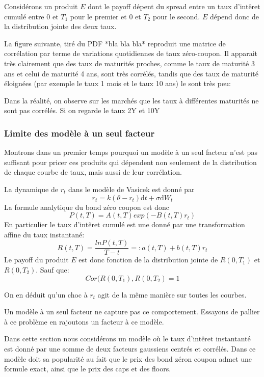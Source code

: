 Considérons un produit $E$ dont le payoff  dépent  du spread entre un taux d'intêret cumulé entre $0$ et $T_1$ pour le premier et $0$ et $T_2$ pour le second. $E$ dépend donc de la distribution jointe des deux taux.

La figure suivante, tiré du PDF *bla bla bla* reproduit une matrice de corrélation par terme de variations quotidiennes de taux zéro-coupon. Il apparait très clairement que des taux de maturités proches, comme le taux de maturité 3 ans et celui de maturité 4 ans, sont très corrélés, tandis que des taux de maturité éloignées (par exemple le taux 1 mois et le taux 10 ans) le sont très peu:


Dans la réalité, on observe sur les marchés que les taux à différentes maturités ne sont pas corrélés. Si on regarde le taux 2Y et 10Y


\subsubsection{Limite des modèle à un seul facteur}
Montrons dans un premier temps pourquoi un modèle à un seul facteur n'est pas suffisant pour pricer ces produits qui dépendent non seulement de la distribution de chaque courbe de taux, mais aussi de leur corrélation. 

La dynamique de $r_t$ dans le modèle de Vasicek est donné par
$$r_t = k(\theta - r_t)  \mathrm{d}t  + \sigma \mathrm{d}W_t$$
La formule analytique du bond zéro coupon est donc
$$P(t, T) = A(t, T) exp(-B(t, T) r_t)$$
En particulier le taux d'intêret cumulé est une donné par une transformation affine du taux instantané:
$$R(t, T) = \frac{ln P(t, T)}{T-t} =: a(t, T) + b(t, T) r_t$$
Le payoff du produit $E$ est donc fonction de la distribution jointe de $R(0, T_1)$ et $R(0, T_2)$. Sauf que:
$$Cor(R(0, T_1), R(0, T_2) = 1$$

On en déduit qu'un choc à $r_t$ agit de la même manière sur toutes les courbes.


Un modèle à un seul facteur ne capture pas ce comportement. Essayons de pallier à ce problème en rajoutons un facteur à ce modèle.

Dans cette section nous considérons un modèle où le taux d'intêret instantanté est donné par une somme de deux facteurs gaussiens centrés et corrélés. Dans ce modèle doit sa popularité au fait que le prix des bond zéron coupon admet une formule exact, ainsi que le prix des caps et des floors.


